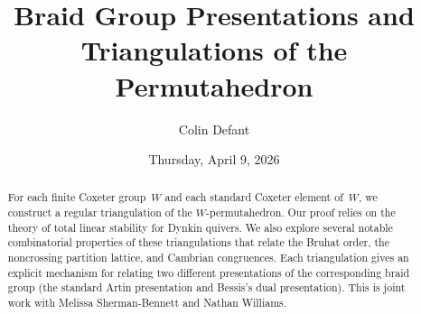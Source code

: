 \documentclass{UAmathtalk}
\author{Colin Defant}
\title{Braid Group Presentations and Triangulations of the Permutahedron}
\date{Thursday, April 9, 2026}
\begin{document}
\maketitle

\begin{abstract}
For each finite Coxeter group~$W$ and each standard Coxeter element of~$W$, we construct a regular triangulation of the $W$-permutahedron. Our proof relies on the theory of total linear stability for Dynkin quivers. We also explore several notable combinatorial properties of these triangulations that relate the Bruhat order, the noncrossing partition lattice, and Cambrian congruences. Each triangulation gives an explicit mechanism for relating two different presentations of the corresponding braid group (the standard Artin presentation and Bessis’s dual presentation). This is joint work with Melissa Sherman-Bennett and Nathan Williams.
\end{abstract}
\end{document}
